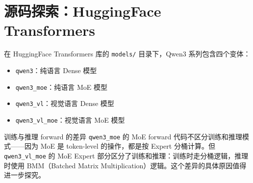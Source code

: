 \section{源码探索：HuggingFace Transformers}

在 HuggingFace Transformers 库的 \texttt{models/} 目录下，Qwen3 系列包含四个变体：
\begin{itemize}
  \item \texttt{qwen3}：纯语言 Dense 模型
  \item \texttt{qwen3\_moe}：纯语言 MoE 模型
  \item \texttt{qwen3\_vl}：视觉语言 Dense 模型
  \item \texttt{qwen3\_vl\_moe}：视觉语言 MoE 模型
\end{itemize}

\begin{knowledgebox}{训练与推理 forward 的差异}
\texttt{qwen3\_moe} 的 MoE forward 代码不区分训练和推理模式——因为 MoE 是 token-level 的操作，都是按 Expert 分桶计算。但 \texttt{qwen3\_vl\_moe} 的 MoE Expert 部分区分了训练和推理：训练时走分桶逻辑，推理时使用 BMM（Batched Matrix Multiplication）逻辑。这个差异的具体原因值得进一步探究。
\end{knowledgebox}

